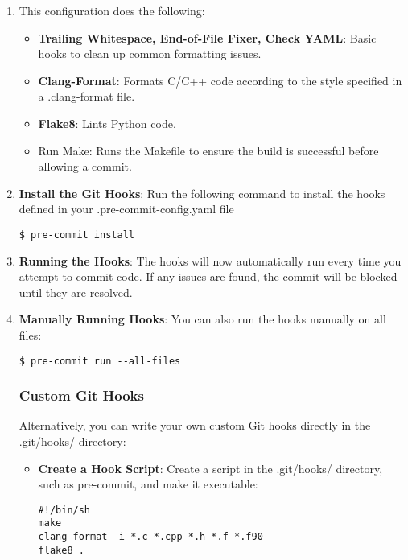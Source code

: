 \documentclass{ol-softwaremanual}
\begin{document}
\begin{enumerate}
\begin{itemize}
\begin{verbatim}
\end{verbatim}
\end{itemize}
\item This configuration does the following:
\begin{itemize}
    \item \textbf{Trailing Whitespace, End-of-File Fixer, Check YAML}: Basic hooks to clean up common formatting issues.
    \item \textbf{Clang-Format}: Formats C/C++ code according to the style specified in a .clang-format file.
    \item \textbf{Flake8}: Lints Python code.
    \item {Run Make}: Runs the Makefile to ensure the build is successful before allowing a commit.
\end{itemize}
\item \textbf{Install the Git Hooks}:
Run the following command to install the hooks defined in your .pre-commit-config.yaml file
\begin{terminal}
\begin{verbatim}
$ pre-commit install
\end{verbatim}
\end{terminal}
\item \textbf{Running the Hooks}:
The hooks will now automatically run every time you attempt to commit code. If any issues are found, the commit will be blocked until they are resolved.
\item \textbf{Manually Running Hooks}:
You can also run the hooks manually on all files:
\begin{terminal}
\begin{verbatim}
$ pre-commit run --all-files
\end{verbatim}
\end{terminal}
\subsubsection{Custom Git Hooks}
Alternatively, you can write your own custom Git hooks directly in the .git/hooks/ directory:
\begin{itemize}
    \item \textbf{Create a Hook Script}:
    Create a script in the .git/hooks/ directory, such as pre-commit, and make it executable:
\begin{example}
\begin{verbatim}
#!/bin/sh
make
clang-format -i *.c *.cpp *.h *.f *.f90
flake8 .
\end{verbatim}
\end{example}


\end{itemize}
\end{enumerate}
\end{document}
